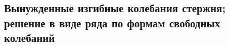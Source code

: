 

\subsection{Вынужденные изгибные колебания стержня; решение в виде ряда по формам свободных колебаний}




